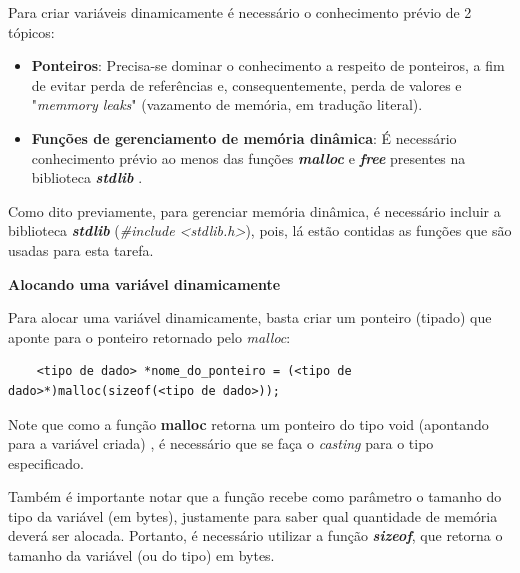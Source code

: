 \documentclass[12pt]{article}
\newcommand\tab[1][1cm]{\hspace*{#1}}
\begin{document}
\par\tab Para criar variáveis dinamicamente é necessário o conhecimento prévio de 2 tópicos:

\begin{itemize}
    \item \textbf{Ponteiros}: Precisa-se dominar o conhecimento a respeito de ponteiros, a fim de evitar perda de referências e, consequentemente, perda de valores e "\textit{memmory leaks}" (vazamento de memória, em tradução literal).
    \item \textbf{Funções de gerenciamento de memória dinâmica}: É necessário conhecimento prévio ao menos das funções \textit{\textbf{malloc}} e \textit{\textbf{free}} presentes na biblioteca \textit{\textbf{stdlib}} \cite{site:malloc_doc}.
\end{itemize}

\par\tab Como dito previamente, para gerenciar memória dinâmica, é necessário incluir a biblioteca \textit{\textbf{stdlib}} (\textit{\#include <stdlib.h>}), pois, lá estão contidas as funções que são usadas para esta tarefa.

\hspace{2cm}
\par\tab\textbf{Alocando uma variável dinamicamente}

\par\tab Para alocar uma variável dinamicamente, basta criar um ponteiro (tipado) que aponte para o ponteiro retornado pelo \textit{malloc}:

\hspace{0.25cm}
\begin{lstlisting}
    <tipo de dado> *nome_do_ponteiro = (<tipo de dado>*)malloc(sizeof(<tipo de dado>));
\end{lstlisting}

\hspace{0.25cm}
\begin{tcolorbox}[colback=yellow!5!white,colframe=yellow!75!black,title=Atenção!]
  \par\tab Note que como a função \textbf{malloc} retorna um ponteiro do tipo void (apontando para a variável criada) \cite{site:malloc_doc}, é necessário que se faça o \textit{casting} para o tipo especificado.
  \par\tab Também é importante notar que a função recebe como parâmetro o tamanho do tipo da variável (em bytes), justamente para saber qual quantidade de memória deverá ser alocada. Portanto, é necessário utilizar a função \textit{\textbf{sizeof}}, que retorna o tamanho da variável (ou do tipo) em bytes.
\end{tcolorbox}
\end{document}
